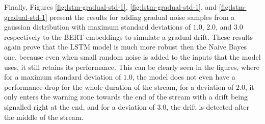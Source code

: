 \documentclass[12pt]{extreport}
\begin{document}
Finally, Figures \ref{fig:lstm-gradual-std-1}, \ref{fig:lstm-gradual-std-1}, and \ref{fig:lstm-gradual-std-1} present the results for adding gradual noise samples from a gaussian distribution with maximum standard deviations of $1.0$, $2.0$, and $3.0$ respectively to the BERT embeddings to simulate a gradual drift. These results again prove that the LSTM model is much more robust then the Naive Bayes one, because even when small random noise is added to the inputs that the model uses, it still retains its performance. This can be clearly seen in the figures, where for a maximum standard deviation of $1.0$, the model does not even have a performance drop for the whole duration of the stream, for a deviation of $2.0$, it only enters the warning zone towards the end of the stream with a drift being signalled right at the end, and for a deviation of $3.0$, the drift is detected after the middle of the stream.
\end{document}
